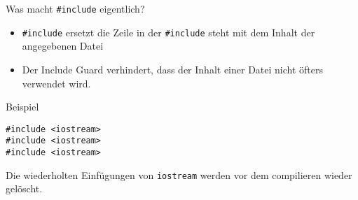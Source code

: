 \documentclass[presentation]{beamer}
\begin{document}
\begin{frame}[label={sec:org1620458},fragile]{Was macht {\color{solarizedYellow}\texttt{\#include}} eigentlich?}
 \begin{itemize}
\item {\color{solarizedYellow}\verb!#include!} ersetzt die Zeile in der {\color{solarizedYellow}\verb!#include!} steht mit dem Inhalt
der angegebenen Datei
\item Der \alert{Include Guard} verhindert, dass der Inhalt einer Datei nicht
öfters verwendet wird.
\end{itemize}
\begin{block}{Beispiel}
\begin{verbatim}
#include <iostream>
#include <iostream>
#include <iostream>
\end{verbatim}
Die wiederholten Einfügungen von {\color{solarizedYellow}\verb!iostream!} werden vor dem compilieren
wieder gelöscht.
\end{block}
\end{frame}
\end{document}
